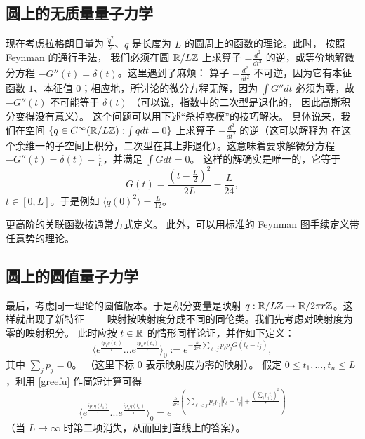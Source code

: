 \subsection{圆上的无质量量子力学} 

现在考虑拉格朗日量为 $\frac{\dot{q}^2}{2}$、$q$ 是长度为 $L$ 的圆周上的函数的理论。此时，
按照 Feynman 的通行手法，
我们必须在圆 $\Bbb
R/L\Bbb Z$ 上求算子 $-\frac{d^2}{dt^2}$ 的逆，或等价地解微分方程
$-G''(t)=\delta(t)$。这里遇到了麻烦：
算子 $-\frac{d^2}{dt^2}$ 不可逆，因为它有本征函数 $1$、本征值 $0$；相应地，所讨论的微分方程无解，因为 $\int G''dt$
必须为零，故 $-G''(t)$ 不可能等于 $\delta(t)$
（可以说，指数中的二次型是退化的，
因此高斯积分变得没有意义）。
这个问题可以用下述“杀掉零模”的技巧解决。
具体说来，我们在空间
$\lbrace{q\in C^\infty(\Bbb R/L\Bbb Z): 
\int qdt=0\rbrace}$ 上求算子 $-\frac{d^2}{dt^2}$ 的逆（这可以解释为
在这个余维一的子空间上积分，二次型在其上非退化）。这意味着要求解微分方程
$-G''(t)=\delta(t)-\frac{1}{L}$，并满足 $\int Gdt=0$。
这样的解确实是唯一的，它等于
\begin{equation}\label{greefu} 
G(t)=\frac{(t-\frac{L}{2})^2}{2L}-\frac{L}{24},
\end{equation}
$t\in [0,L]$。于是例如
$\langle q(0)^2\rangle=\frac{L}{12}$。 

更高阶的关联函数按通常方式定义。
此外，可以用标准的 Feynman 图手续定义带任意势的理论。

\subsection{圆上的圆值量子力学} 
最后，考虑同一理论的圆值版本。于是积分变量是映射 $q: \Bbb R/L\Bbb
Z\to \Bbb R/2\pi r\Bbb Z$。这样就出现了新特征——
映射按映射度分成不同的同伦类。我们先考虑对映射度为零的映射积分。
此时应按 $t\in \Bbb
R$ 的情形同样论证，并作如下定义：
$$
\langle e^{\frac{ip_1q(t_1)}{r}}...e^{\frac{ip_nq(t_n)}{r}}\rangle_0:=
e^{-\frac{\hbar}{2r^2}\sum_{\ell,j}p_\ell p_j G(t_\ell-t_j)},
$$
其中 $\sum_j p_j=0$。
（这里下标 $0$ 表示映射度为零的映射）。
假定 $0\le t_1,...,t_n\le L$，利用 \eqref{greefu} 作简短计算可得
$$
\langle e^{\frac{ip_1q(t_1)}{r}}...e^{\frac{ip_nq(t_n)}{r}}\rangle_0
=e^{\frac{\hbar}{2r^2}(\sum_{\ell<j} p_\ell p_j |t_\ell-t_j|+\frac{(\sum_j p_jt_j)^2}{L})}
$$
（当 $L\to \infty$ 时第二项消失，从而回到直线上的答案）。

